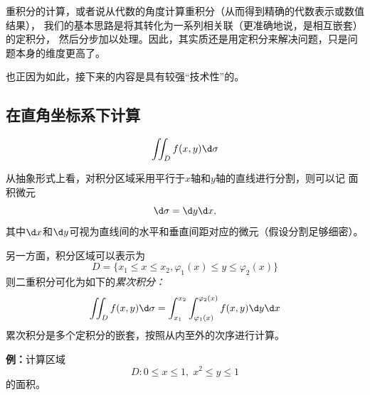 重积分的计算，或者说从代数的角度计算重积分（从而得到精确的代数表示或数值结果），
我们的基本思路是将其转化为一系列相关联（更准确地说，是相互嵌套）的定积分，
然后分步加以处理。因此，其实质还是用定积分来解决问题，只是问题本身的维度更高了。

也正因为如此，接下来的内容是具有较强“技术性”的。

\subsection{在直角坐标系下计算}

$$\iint_Df(x,y)\d\sigma
$$

从抽象形式上看，对积分区域采用平行于$x$轴和$y$轴的直线进行分割，则可以记
面积微元
$$\d\sigma=\d y\d x,$$
其中$\d x$和$\d y$可视为直线间的水平和垂直间距对应的微元（假设分割足够细密）。

另一方面，积分区域可以表示为
$$D=\{x_1\leq x\leq x_2,\varphi_1(x)\leq y\leq \varphi_2(x)\}$$
则二重积分可化为如下的{\it 累次积分：}
$${\iint_Df(x,y)\d\sigma=\int_{x_1}^{x_2}
\int_{\varphi_1(x)}^{\varphi_2(x)}f(x,y)\d y\d x}$$
累次积分是多个定积分的嵌套，按照从内至外的次序进行计算。

{\bf 例：}计算区域
$$D:0\leq x\leq 1,\;x^2\leq y\leq 1$$
的面积。

\begin{center}
\end{center}

